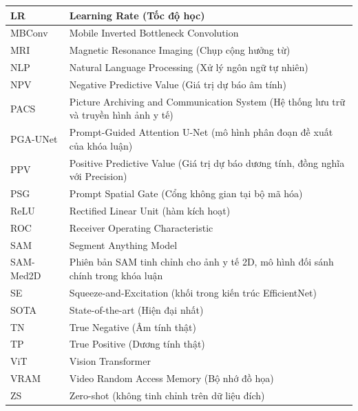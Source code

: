 \begin{longtable}{|>{\raggedright\arraybackslash}p{3.2cm}|p{10.8cm}|}
LR & Learning Rate (Tốc độ học) \\ \hline
MBConv & Mobile Inverted Bottleneck Convolution \\ \hline
MRI & Magnetic Resonance Imaging (Chụp cộng hưởng từ) \\ \hline
NLP & Natural Language Processing (Xử lý ngôn ngữ tự nhiên) \\ \hline
NPV & Negative Predictive Value (Giá trị dự báo âm tính) \\ \hline
PACS & Picture Archiving and Communication System (Hệ thống lưu trữ và truyền hình ảnh y tế) \\ \hline
PGA-UNet & Prompt-Guided Attention U-Net (mô hình phân đoạn đề xuất của khóa luận) \\ \hline
PPV & Positive Predictive Value (Giá trị dự báo dương tính, đồng nghĩa với Precision) \\ \hline
PSG & Prompt Spatial Gate (Cổng không gian tại bộ mã hóa) \\ \hline
ReLU & Rectified Linear Unit (hàm kích hoạt) \\ \hline
ROC & Receiver Operating Characteristic \\ \hline
SAM & Segment Anything Model \\ \hline
SAM-Med2D & Phiên bản SAM tinh chỉnh cho ảnh y tế 2D, mô hình đối sánh chính trong khóa luận \\ \hline
SE & Squeeze-and-Excitation (khối trong kiến trúc EfficientNet) \\ \hline
SOTA & State-of-the-art (Hiện đại nhất) \\ \hline
TN & True Negative (Âm tính thật) \\ \hline
TP & True Positive (Dương tính thật) \\ \hline
ViT & Vision Transformer \\ \hline
VRAM & Video Random Access Memory (Bộ nhớ đồ họa) \\ \hline
ZS & Zero-shot (không tinh chỉnh trên dữ liệu đích) \\ \hline
\end{longtable}
